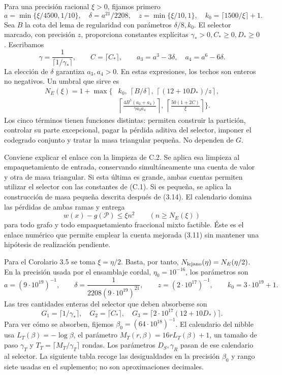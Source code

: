 \documentclass[spanish,11pt,a4paper]{article}
\begin{document}
Para una precisión racional \(\xi>0\), fijamos primero \[
a=\min\{\xi/4500,1/10\},\quad
\delta=a^{21}/2208,\quad z=\min\{\xi/10,1\},\quad
k_0=\lceil1500/\xi\rceil+1.
\] Sea \(B\) la cota del lema de regularidad con parámetros \(\delta/8,k_0\). El selector marcado, con precisión \(z\), proporciona constantes explícitas \(\gamma_*>0,C_*\ge0,D_*\ge0\). Escribamos \[
\gamma=\frac1{\lceil1/\gamma_*\rceil},\qquad C=\lceil C_*\rceil,\qquad
a_3=a^3-3\delta,\quad a_4=a^6-6\delta.
\] La elección de \(\delta\) garantiza \(a_3,a_4>0\). En estas expresiones, los techos son enteros no negativos. Un umbral que sirve es \[
\begin{split}
N_E(\xi)=1+\max\biggl\{&
k_0,\ \left\lceil B/\delta\right\rceil,\
\left\lceil(12+10D_*)/z\right\rceil,\\
&\left\lceil\frac{4B^5(a_3+a_4)}{\gamma a_3a_4}\right\rceil,\
\left\lceil\frac{50(1+2C)}{\xi}\right\rceil
\biggr\}.
\end{split}
\tag{C.1}
\] Los cinco términos tienen funciones distintas: permiten construir la partición, controlar su parte excepcional, pagar la pérdida aditiva del selector, imponer el codegrado conjunto y tratar la masa triangular pequeña. No dependen de \(G\).

Conviene explicar el enlace con la limpieza de C.2. Se aplica esa limpieza al empaquetamiento de entrada, conservando simultáneamente una cuenta de valor y otra de masa triangular. Si esta última es grande, ambas cuentas permiten utilizar el selector con las constantes de (C.1). Si es pequeña, se aplica la construcción de masa pequeña descrita después de (3.14). El calendario domina las pérdidas de ambas ramas y entrega \[
w(x)-g(\mathcal P)\le\xi n^2
\qquad(n\ge N_E(\xi))
\tag{C.2}
\] para todo grafo y todo empaquetamiento fraccional mixto factible. Éste es el enlace numérico que permite emplear la cuenta mejorada (3.11) sin mantener una hipótesis de realización pendiente.

Para el Corolario 3.5 se toma \(\xi=\eta/2\). Basta, por tanto, \(N_{\rm lejano}(\eta)=N_E(\eta/2)\). En la precisión usada por el ensamblaje cordal, \(\eta_0=10^{-16}\), los parámetros son \[
a=(9\cdot10^{19})^{-1},\qquad
\delta=\frac1{2208(9\cdot10^{19})^{21}},\qquad
z=(2\cdot10^{17})^{-1},\qquad k_0=3\cdot10^{19}+1.
\] Las tres cantidades enteras del selector que deben absorberse son \[
G_1=\lceil1/\gamma_*\rceil,\quad G_2=\lceil C_*\rceil,\quad
G_3=\lceil2\cdot10^{17}(12+10D_*)\rceil.
\] Para ver cómo se absorben, fijemos \(\beta_0=(64\cdot10^{18})^{-1}\). El calendario del nibble usa \(L_T(\beta)=-\log\beta\), el parámetro \(M_T(r,\beta)=16rL_T(\beta)+1\), un tamaño de paso \(\gamma_T\) y \(T_T=\lceil M_T/\gamma_T\rceil\) rondas. Los parámetros \(D_S,\gamma_R\) pasan de ese calendario al selector. La siguiente tabla recoge las desigualdades en la precisión \(\beta_0\) y rango siete usadas en el suplemento; no son aproximaciones decimales.
\end{document}
